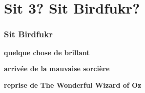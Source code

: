 \chapter*{Sit 3? Sit Birdfukr?}

\subsection*{Sit Birdfukr}
\begin{center}\textbf{quelque chose de brillant}\end{center}

{%
\parindent 0pt
\noindent
\ifx\preLilyPondExample \undefined
\else
  \expandafter\preLilyPondExample
\fi
\def\lilypondbook{}%

\ifx\postLilyPondExample \undefined
\else
  \expandafter\postLilyPondExample
\fi
}
\begin{center}\textbf{arrivée de la mauvaise sorcière}\end{center}
\begin{center}\textbf{reprise de The Wonderful Wizard of Oz}\end{center}
